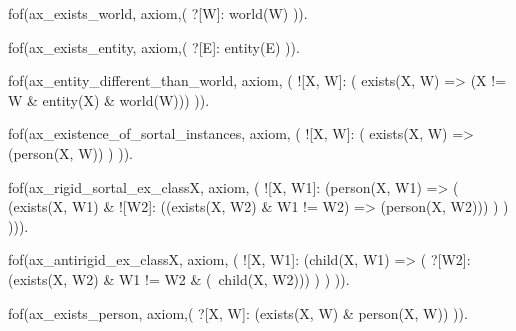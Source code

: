 
fof(ax_exists_world, axiom,(
  ?[W]: world(W)
)).

fof(ax_exists_entity, axiom,(
  ?[E]: entity(E)
)).

fof(ax_entity_different_than_world, axiom, (
  ![X, W]: ( exists(X, W)  => (X != W & entity(X) & world(W)))
)).


fof(ax_existence_of_sortal_instances, axiom, (
  ![X, W]: ( exists(X, W) => (person(X, W)) )
)).


fof(ax_rigid_sortal_ex_classX, axiom, (
  ![X, W1]: (person(X, W1) => ( 
              (exists(X, W1) &  %
            ![W2]: ((exists(X, W2) & W1 != W2) => (person(X, W2))) %
    )
  )
))). %


fof(ax_antirigid_ex_classX, axiom, (
  ![X, W1]: (child(X, W1) => (
            ?[W2]: (exists(X, W2) & W1 != W2 & (~child(X, W2))) %
    )
  )
)). %



fof(ax_exists_person, axiom,(
  ?[X, W]: (exists(X, W) & person(X, W))
)).

